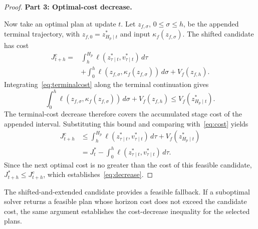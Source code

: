 \documentclass[11pt,a4paper]{article}
\numberwithin{equation}{section}
\theoremstyle{remark}\newtheorem{remark}{Remark}
\begin{document}
\begin{proof}
\par\medskip\noindent\textbf{Part 3: Optimal-cost decrease.}\par\nobreak\smallskip\noindent
Now take an optimal plan at update $t$. Let $z_{f,\sigma}$, $0\le\sigma\le h$, be the appended terminal trajectory, with $z_{f,0}=z_{H_p\mid t}^*$ and input $\kappa_f(z_{f,\sigma})$. The shifted candidate has cost
\[
\begin{aligned}
J_{t+h}^{c}
={}&\int_h^{H_p}\ell(z_{\tau\mid t}^*,v_{\tau\mid t}^*)\,d\tau\\
&+\int_0^h\ell(z_{f,\sigma},\kappa_f(z_{f,\sigma}))\,d\sigma+V_f(z_{f,h}).
\end{aligned}
\]
Integrating~\eqref{eq:terminalcost} along the terminal continuation gives
\[
\int_0^h\ell(z_{f,\sigma},\kappa_f(z_{f,\sigma}))\,d\sigma
+V_f(z_{f,h})\le V_f(z_{H_p\mid t}^*).
\]
The terminal-cost decrease therefore covers the accumulated stage cost of the appended interval. Substituting this bound and comparing with~\eqref{eq:cost} yields
\[
\begin{aligned}
J_{t+h}^{c}
&\le\int_h^{H_p}\ell(z_{\tau\mid t}^*,v_{\tau\mid t}^*)\,d\tau+V_f(z_{H_p\mid t}^*)\\
&=J_t^*-\int_0^h\ell(z_{\tau\mid t}^*,v_{\tau\mid t}^*)\,d\tau.
\end{aligned}
\]
Since the next optimal cost is no greater than the cost of this feasible candidate, $J_{t+h}^*\le J_{t+h}^{c}$, which establishes~\eqref{eq:decrease}.
\end{proof}
\par\medskip\noindent
The shifted-and-extended candidate provides a feasible fallback. If a suboptimal solver returns a feasible plan whose horizon cost does not exceed the candidate cost, the same argument establishes the cost-decrease inequality for the selected plans.
\end{document}
